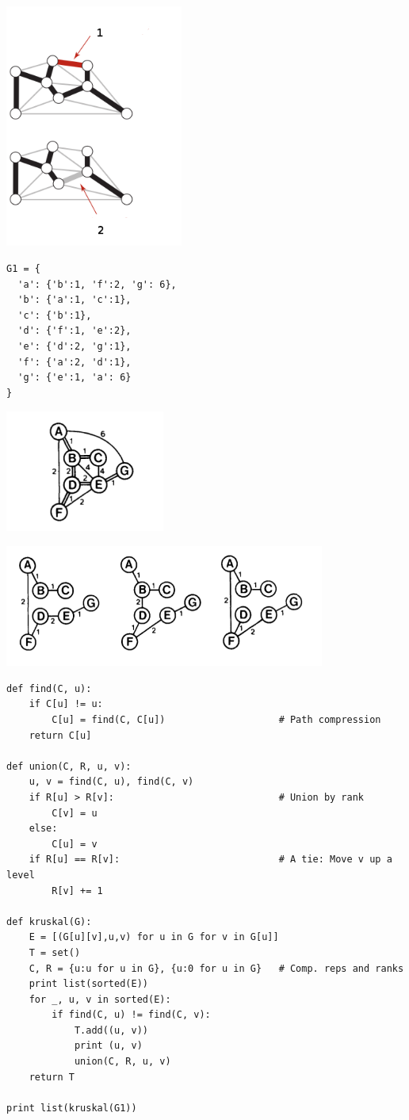 \documentclass[12pt,fleqn]{article}\usepackage{../common}
\begin{document}
\includegraphics[height=8cm]{graph_prop.png}

\begin{verbatim}
G1 = {
  'a': {'b':1, 'f':2, 'g': 6},
  'b': {'a':1, 'c':1},
  'c': {'b':1},
  'd': {'f':1, 'e':2},
  'e': {'d':2, 'g':1},
  'f': {'a':2, 'd':1},
  'g': {'e':1, 'a': 6}
}
\end{verbatim}

\includegraphics[height=4cm]{minspan_0.png}

\includegraphics[height=4cm]{minspan_1.png}


\begin{verbatim}
def find(C, u):
    if C[u] != u:
        C[u] = find(C, C[u])                    # Path compression
    return C[u]

def union(C, R, u, v):
    u, v = find(C, u), find(C, v)
    if R[u] > R[v]:                             # Union by rank
        C[v] = u
    else:
        C[u] = v
    if R[u] == R[v]:                            # A tie: Move v up a level
        R[v] += 1

def kruskal(G):
    E = [(G[u][v],u,v) for u in G for v in G[u]]
    T = set()
    C, R = {u:u for u in G}, {u:0 for u in G}   # Comp. reps and ranks
    print list(sorted(E))
    for _, u, v in sorted(E):
        if find(C, u) != find(C, v):
            T.add((u, v))
            print (u, v)
            union(C, R, u, v)
    return T

print list(kruskal(G1))
\end{verbatim}
\end{document}
